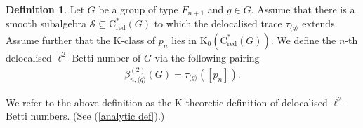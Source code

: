 \documentclass[a4paper,leqno,12pt]{article}
\numberwithin{equation}{section}
\theoremstyle{plain}
\theoremstyle{definition}
\newtheorem{definition}[theoremcounter]{Definition}
\theoremstyle{remark}
\newtheorem{remark}[theoremcounter]{Remark}
\newcommand{\Csr}{\mathrm{C}^*_{\text{red}}}
\begin{document}
	
		\begin{definition} \label{def:deloc l2betti num formula}
			Let $G$ be a group of type $F_{n+1}$ and $g\in G$. Assume that there is a smooth subalgebra $\mathcal S \subseteq \Csr (G)$ to which the delocalised trace $\tau_{\langle g \rangle}$ extends. Assume further that the K-class of $p_n$ lies in $\mathrm K_0(\Csr (G))$.  We define the $n$-th delocalised $\ell^2$-Betti number of $G$ via the following pairing
			\begin{gather} \label{K-theoretic def}
				\beta ^{(2)}_{n, \langle g\rangle}(G) = \tau_{\langle g\rangle} ([p_n]).
			\end{gather}
		\end{definition}
  We refer to the above definition as the K-theoretic definition of delocalised $\ell^2$-Betti numbers. (See (\ref{analytic def}).)
		
		
	
\end{document}
